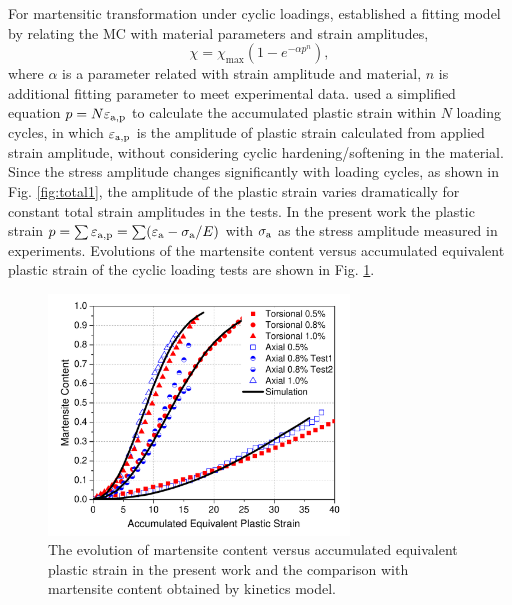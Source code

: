 \documentclass[final,5p,times,onecolumn,10pt,sort&compress]{elsarticle}
\newcommand{\marked}[1]{\textcolor{red}{#1}}
\begin{document}
For martensitic transformation under cyclic loadings, \cite{Smaga2008Deformation} established a fitting model by relating the MC with material parameters and strain amplitudes,
\begin{equation}\label{eq:Smaga model}
\chi =\chi _{\max}\left ( 1-e^{-\alpha p ^{n}} \right ),
\end{equation}
where $\alpha$ is a parameter related with strain amplitude and material, $n$ is additional fitting parameter to meet experimental data. \cite{Smaga2008Deformation} used a simplified equation $p= N { \varepsilon _{\rm a,p}}$ to calculate the accumulated plastic strain within $N$ loading cycles, in which $\varepsilon _{\rm a,p}$ is the amplitude of plastic strain calculated from applied strain amplitude, without considering cyclic hardening/softening in the material. Since the stress amplitude changes significantly with loading cycles, as shown in Fig. \ref{fig:total1}, the amplitude of the plastic strain varies dramatically for constant total strain amplitudes in the tests. In the present work the plastic strain $p=\sum \varepsilon _{\rm a,p}=\sum (\varepsilon_{\rm a} - \sigma_{\rm a}/E)$ with $\sigma_{\rm a}$ as the stress amplitude measured in experiments.
Evolutions of the martensite content versus accumulated equivalent plastic strain of the cyclic loading tests are shown in Fig. \ref{fig:EvolutionModel3}.

\begin{figure}[ht]
  \begin{center}
  \includegraphics[width=8cm]{EvolutionModel3.pdf}
  \caption{The evolution of martensite content versus accumulated equivalent plastic strain in the present work and the comparison with martensite content obtained by kinetics model.}
  \label{fig:EvolutionModel3}
  \end{center}
\end{figure}

\end{document}
